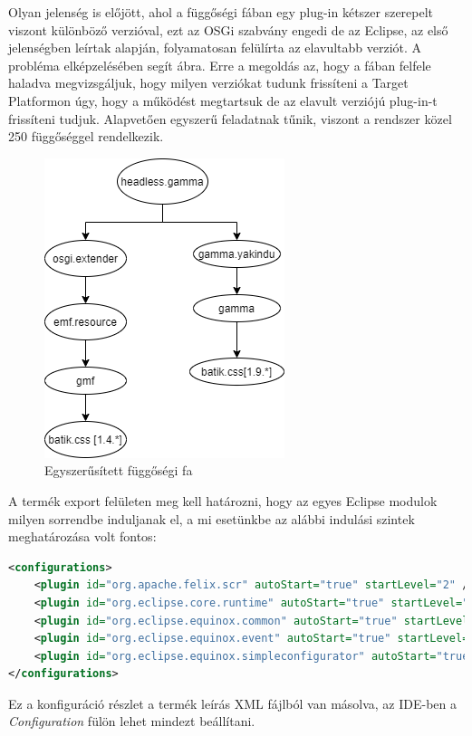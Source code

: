 Olyan jelenség is előjött, ahol a függőségi fában egy plug-in kétszer szerepelt viszont különböző verzióval, ezt az OSGi szabvány engedi de az Eclipse, az első jelenségben leírtak alapján, folyamatosan felülírta az elavultabb verziót. A probléma elképzelésében segít   ábra. Erre a megoldás az, hogy a fában felfele haladva megvizsgáljuk, hogy milyen verziókat tudunk frissíteni a Target Platformon úgy, hogy a működést megtartsuk de az elavult verziójú plug-in-t frissíteni tudjuk. Alapvetően egyszerű feladatnak tűnik, viszont a rendszer közel 250 függőséggel rendelkezik.

\begin{figure}[!ht]
	\centering
	\includegraphics[keepaspectratio]{figures/depend.png}
	\caption{Egyszerűsített függőségi fa}
	\label{fig:depend}
\end{figure}

A termék export felületen meg kell határozni, hogy az egyes Eclipse modulok milyen sorrendbe induljanak el, a mi esetünkbe az alábbi indulási szintek meghatározása volt fontos:
\begin{lstlisting}[language=XML]
<configurations>
	<plugin id="org.apache.felix.scr" autoStart="true" startLevel="2" />
	<plugin id="org.eclipse.core.runtime" autoStart="true" startLevel="0" />
	<plugin id="org.eclipse.equinox.common" autoStart="true" startLevel="2" />
	<plugin id="org.eclipse.equinox.event" autoStart="true" startLevel="2" />
	<plugin id="org.eclipse.equinox.simpleconfigurator" autoStart="true" startLevel="1" />
</configurations>
\end{lstlisting}
Ez a konfiguráció részlet a termék leírás XML fájlból van másolva, az IDE-ben a \textit{Configuration} fülön lehet mindezt beállítani.

